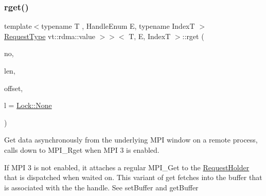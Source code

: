 \subsubsection{\texorpdfstring{rget()}{rget()}\hspace{0.1cm}{\footnotesize\ttfamily [1/2]}}
{\footnotesize\ttfamily template$<$typename T , Handle\+Enum E, typename IndexT $>$ \\
\hyperlink{structvt_1_1rdma_1_1_handle_3_01_t_00_01_e_00_01_index_t_00_01typename_01std_1_1enable__if__t_3_d15dac1b5db6e2bc0fb0b8aca42b1456_a94cb0db8d9b038fb504cb01b1d1d37a9}{Request\+Type} vt\+::rdma\+::value $>$$>$$<$ T, E, IndexT $>$\+::rget (\begin{DoxyParamCaption}\item[{\hyperlink{namespacevt_a866da9d0efc19c0a1ce79e9e492f47e2}{vt\+::\+Node\+Type}}]{no,  }\item[{std\+::size\+\_\+t}]{len,  }\item[{int}]{offset,  }\item[{\hyperlink{namespacevt_1_1rdma_ac5c20b41a653e520b6305d4d454ecb70}{Lock}}]{l = {\ttfamily \hyperlink{namespacevt_1_1rdma_ac5c20b41a653e520b6305d4d454ecb70a6adf97f83acf6453d4a6a4b1070f3754}{Lock\+::\+None}} }\end{DoxyParamCaption})}



Get data asynchronously from the underlying M\+PI window on a remote process, calls down to {\ttfamily M\+P\+I\+\_\+\+Rget} when M\+PI 3 is enabled. 

If M\+PI 3 is not enabled, it attaches a regular {\ttfamily M\+P\+I\+\_\+\+Get} to the {\ttfamily \hyperlink{structvt_1_1rdma_1_1_request_holder}{Request\+Holder}} that is dispatched when waited on. This variant of {\ttfamily get} fetches into the buffer that is associated with the the handle. See {\ttfamily set\+Buffer} and {\ttfamily get\+Buffer} 



